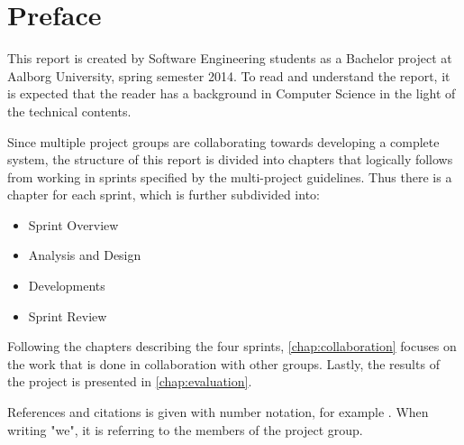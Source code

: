 \newcommand{\headerPreface}{Preface}
\cleardoublepage
{}
\pdfbookmark{\headerPreface}{chap:preface}
\chapter*{\headerPreface}\label{chap:preface}
This report is created by Software Engineering students as a Bachelor project at Aalborg University, spring semester 2014.
To read and understand the report, it is expected that the reader has a background in Computer Science in the light of the technical contents.


Since multiple project groups are collaborating towards developing a complete system, the structure of this report is divided into chapters that logically follows from working in sprints specified by the multi-project guidelines.
Thus there is a chapter for each sprint, which is further subdivided into:


\begin{itemize}
\item Sprint Overview
\item Analysis and Design
\item Developments
\item Sprint Review
\end{itemize}

Following the chapters describing the four sprints, \cref{chap:collaboration} focuses on the work that is done in collaboration with other groups.
Lastly, the results of the project is presented in \cref{chap:evaluation}.

References and citations is given with number notation, for example . 
When writing "we", it is referring to the members of the project group.

